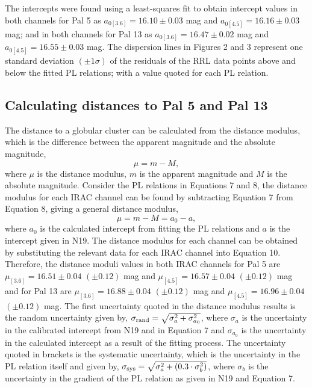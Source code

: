 \documentclass[11pt]{iopart}
\begin{document}
The intercepts were found using a least-squares fit to obtain intercept values in both channels for Pal 5 as $a_{0[3.6]} = 16.10\pm0.03$ mag and $a_{0[4.5]} = 16.16\pm0.03$ mag; and in both channels for Pal 13 as $a_{0[3.6]} = 16.47\pm0.02$ mag and $a_{0[4.5]} = 16.55\pm0.03$ mag. The dispersion lines in Figures 2 and 3 represent one standard deviation $(\pm1\sigma)$ of the residuals of the RRL data points above and below the fitted PL relations; with a value quoted for each PL relation.



\subsection{Calculating distances to Pal 5 and Pal 13}
The distance to a globular cluster can be calculated from the distance modulus, which is the difference between the apparent magnitude and the absolute magnitude,
\begin{equation}
    \mu = m - M,
\end{equation}
where $\mu$ is the distance modulus, $m$ is the apparent magnitude and $M$ is the absolute magnitude. Consider the PL relations in Equations 7 and 8, the distance modulus for each IRAC channel can be found by subtracting Equation 7 from Equation 8, giving a general distance modulus,
\begin{equation}
    \mu = m - M = a_{0} - a,
\end{equation}
where $a_{0}$ is the calculated intercept from fitting the PL relations and $a$ is the intercept given in N19. The distance modulus for each channel can be obtained by substituting the relevant data for each IRAC channel into Equation 10. Therefore, the distance moduli values in both IRAC channels for Pal 5 are $\mu_{[3.6]} = 16.51\pm0.04$ $(\pm0.12)$ mag and $\mu_{[4.5]} = 16.57\pm0.04$ $(\pm0.12)$ mag and for Pal 13 are $\mu_{[3.6]} = 16.88\pm0.04$ $(\pm0.12)$ mag and $\mu_{[4.5]} = 16.96\pm0.04$ $(\pm0.12)$ mag. The first uncertainty quoted in the distance modulus results is the random uncertainty given by, $\sigma_{\rm rand} = \sqrt{\sigma_{a}^2 + \sigma_{a_{0}}^2}$, where $\sigma_{a}$ is the uncertainty in the calibrated intercept from N19 and in Equation 7 and $\sigma_{a_{0}}$ is the uncertainty in the calculated intercept as a result of the fitting process. The uncertainty quoted in brackets is the systematic uncertainty, which is the uncertainty in the PL relation itself and given by, $ \sigma_{\rm sys} = \sqrt{\sigma_{a}^2 + (0.3\cdot\sigma_{b}^2)}$, where $\sigma_{b}$ is the uncertainty in the gradient of the PL relation as given in N19 and Equation 7.
\end{document}
